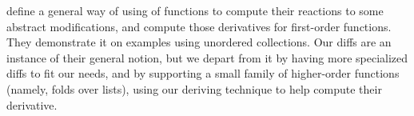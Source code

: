 \citet{cai2014} define a general way of using  of functions
to compute their reactions to some abstract modifications, and compute those
derivatives for first-order functions.  They demonstrate it on examples using
unordered collections.  Our diffs are an instance of their general notion, but
we depart from it by having more specialized diffs to fit our needs, and by
supporting a small family of higher-order functions (namely, folds over lists),
using our deriving technique to help compute their derivative.









